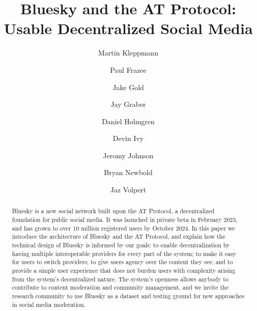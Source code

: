 \documentclass[sigconf]{acmart}
\begin{document}
\title{Bluesky and the AT Protocol: Usable Decentralized Social Media}

\author{Martin Kleppmann}

\author{Paul Frazee}

\author{Jake Gold}

\author{Jay Graber}

\author{Daniel Holmgren}

\author{Devin Ivy}

\author{Jeromy Johnson}

\author{Bryan Newbold}

\author{Jaz Volpert}

\renewcommand{\shortauthors}{Kleppmann, et al.}

\begin{abstract}
    Bluesky is a new social network built upon the AT Protocol, a decentralized foundation for public social media.
    It was launched in private beta in February 2023, and has grown to over 10 million registered users by October 2024.
    In this paper we introduce the architecture of Bluesky and the AT Protocol, and explain how the technical design of Bluesky is informed by our goals: to enable decentralization by having multiple interoperable providers for every part of the system; to make it easy for users to switch providers; to give users agency over the content they see; and to provide a simple user experience that does not burden users with complexity arising from the system's decentralized nature.
    The system's openness allows anybody to contribute to content moderation and community management, and we invite the research community to use Bluesky as a dataset and testing ground for new approaches in social media moderation.
\end{abstract}
\end{document}
